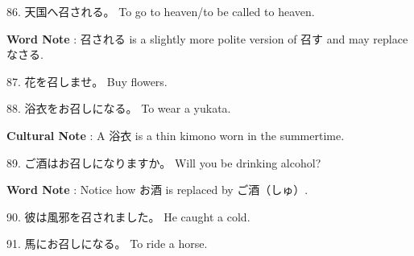 \par{86. 天国へ召される。 \hfill\break
To go to heaven\slash to be called to heaven. \hfill\break
}
 
\par{\textbf{Word Note }: 召される is a slightly more polite version of 召す and may replace なさる. }

\par{87. 花を召しませ。 \hfill\break
Buy flowers. }

\par{88. 浴衣をお召しになる。 \hfill\break
To wear a yukata. }

\par{\textbf{Cultural Note }: A 浴衣 is a thin kimono worn in the summertime. }

\par{89. ご酒はお召しになりますか。 \hfill\break
Will you be drinking alcohol? \hfill\break
}

\par{\textbf{Word Note }: Notice how お酒 is replaced by ご酒（しゅ）. }

\par{90. 彼は風邪を召されました。 \hfill\break
He caught a cold. }

\par{91. 馬にお召しになる。 \hfill\break
To ride a horse. }
    